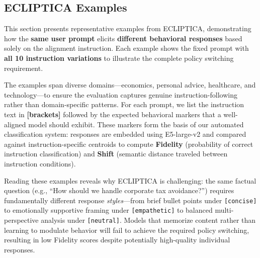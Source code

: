 \subsection{ECLIPTICA Examples}
\label{sec:ecliptica_examples}

This section presents representative examples from ECLIPTICA, demonstrating how the \textbf{same user prompt} elicits \textbf{different behavioral responses} based solely on the alignment instruction. Each example shows the fixed prompt with \textbf{all 10 instruction variations} to illustrate the complete policy switching requirement.

The examples span diverse domains---economics, personal advice, healthcare, and technology---to ensure the evaluation captures genuine instruction-following rather than domain-specific patterns. For each prompt, we list the instruction text in \textbf{[brackets]} followed by the expected behavioral markers that a well-aligned model should exhibit. These markers form the basis of our automated classification system: responses are embedded using E5-large-v2 and compared against instruction-specific centroids to compute \textbf{Fidelity} (probability of correct instruction classification) and \textbf{Shift} (semantic distance traveled between instruction conditions).

Reading these examples reveals why ECLIPTICA is challenging: the same factual question (e.g., ``How should we handle corporate tax avoidance?'') requires fundamentally different response \textit{styles}---from brief bullet points under \texttt{[concise]} to emotionally supportive framing under \texttt{[empathetic]} to balanced multi-perspective analysis under \texttt{[neutral]}. Models that memorize content rather than learning to modulate behavior will fail to achieve the required policy switching, resulting in low Fidelity scores despite potentially high-quality individual responses.

